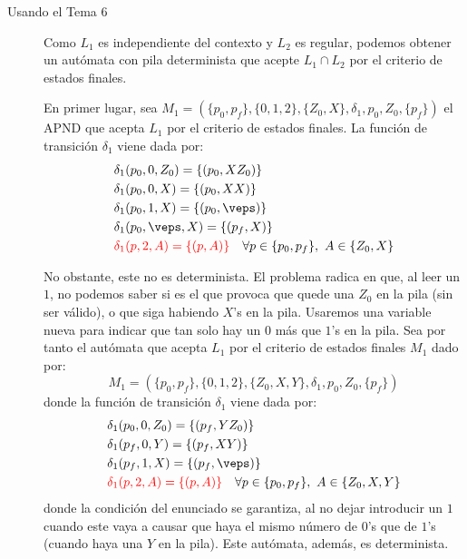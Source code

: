 \begin{ejercicio}
\begin{description}
        \item[Usando el Tema 6]
        
        Como $L_1$ es independiente del contexto y $L_2$ es regular, podemos obtener un autómata con pila determinista que acepte $L_1\cap L_2$ por el criterio de estados finales.

        En primer lugar, sea $M_1=(\{p_0,p_f\},\{0,1,2\},\{Z_0,X\},\delta_1,p_0,Z_0,\{p_f\})$ el APND que acepta $L_1$ por el criterio de estados finales. La función de transición $\delta_1$ viene dada por:
        \begin{align*}
            &\delta_1(p_0,0,Z_0) = \{(p_0,XZ_0)\} \\
            &\delta_1(p_0,0,X) = \{(p_0,XX)\} \\
            &\delta_1(p_0,1,X) = \{(p_0,\veps)\} \\
            &\delta_1(p_0,\veps,X) = \{(p_f,X)\} \\
            &\red{\delta_1(p,2,A) = \{(p,A)\}} \quad \forall p\in\{p_0,p_f\},\ A\in\{Z_0,X\}
        \end{align*}

        No obstante, este no es determinista. El problema radica en que, al leer un $1$, no podemos saber si es el que provoca que quede una $Z_0$ en la pila (sin ser válido), o que siga habiendo $X$'s en la pila. Usaremos una variable nueva para indicar que tan solo hay un $0$ más que $1$'s en la pila. Sea por tanto el autómata que acepta $L_1$ por el criterio de estados finales $M_1$ dado por:
        \begin{equation*}
            M_1 = (\{p_0,p_f\},\{0,1,2\},\{Z_0,X,Y\},\delta_1,p_0,Z_0,\{p_f\})
        \end{equation*}
        donde la función de transición $\delta_1$ viene dada por:
        \begin{align*}
            &\delta_1(p_0,0,Z_0) = \{(p_f,YZ_0)\} \\
            &\delta_1(p_f,0,Y) = \{(p_f,XY)\} \\
            &\delta_1(p_f,1,X) = \{(p_f,\veps)\} \\
            &\red{\delta_1(p,2,A) = \{(p,A)\}} \quad \forall p\in\{p_0,p_f\},\ A\in\{Z_0,X,Y\}
        \end{align*}
        donde la condición del enunciado se garantiza, al no dejar introducir un $1$ cuando este vaya a causar que haya el mismo número de $0$'s que de $1$'s (cuando haya una $Y$ en la pila).
        Este autómata, además, es determinista.
        

\end{description}
\end{ejercicio}
